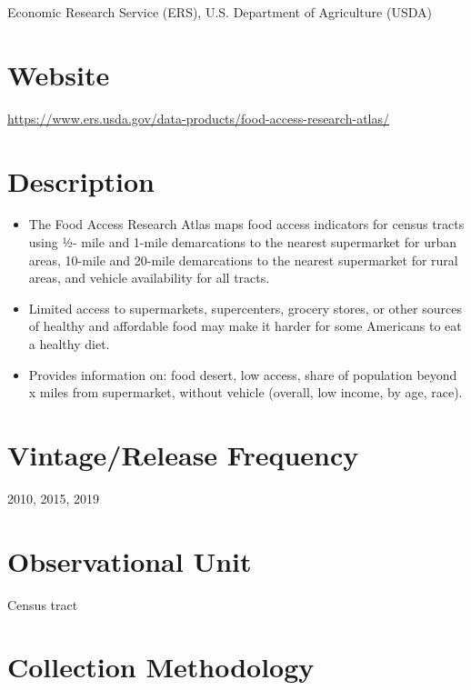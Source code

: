 \documentclass[
]{book}
\providecommand{\tightlist}{%
  \setlength{\itemsep}{0pt}\setlength{\parskip}{0pt}}
\begin{document}
Economic Research Service (ERS), U.S. Department of Agriculture (USDA)

\hypertarget{website-25}{%
\section{Website}\label{website-25}}

\url{https://www.ers.usda.gov/data-products/food-access-research-atlas/}

\hypertarget{description-25}{%
\section{Description}\label{description-25}}

\begin{itemize}
\tightlist
\item
  The Food Access Research Atlas maps food access indicators for census tracts using ½- mile and 1-mile demarcations to the nearest supermarket for urban areas, 10-mile and 20-mile demarcations to the nearest supermarket for rural areas, and vehicle availability for all tracts.
\item
  Limited access to supermarkets, supercenters, grocery stores, or other sources of healthy and affordable food may make it harder for some Americans to eat a healthy diet.
\item
  Provides information on: food desert, low access, share of population beyond x miles from supermarket, without vehicle (overall, low income, by age, race).
\end{itemize}

\hypertarget{vintagerelease-frequency-25}{%
\section{Vintage/Release Frequency}\label{vintagerelease-frequency-25}}

2010, 2015, 2019

\hypertarget{observational-unit-25}{%
\section{Observational Unit}\label{observational-unit-25}}

Census tract

\hypertarget{collection-methodology-25}{%
\section{Collection Methodology}\label{collection-methodology-25}}
\end{document}
